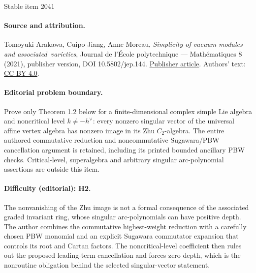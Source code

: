 \documentclass[11pt]{article}
\numberwithin{equation}{section}
\begin{document}
\begin{center}{\Large Stable item 2041}\end{center}
\paragraph{Source and attribution.}
Tomoyuki Arakawa, Cuipo Jiang, Anne Moreau, \emph{Simplicity of vacuum modules and associated varieties}, Journal de l’École polytechnique — Mathématiques 8 (2021), publisher version, DOI 10.5802/jep.144. \href{https://jep.centre-mersenne.org/articles/10.5802/jep.144/}{Publisher article}. Authors' text: \href{https://creativecommons.org/licenses/by/4.0/}{CC BY 4.0}.
\paragraph{Editorial problem boundary.}
Prove only Theorem 1.2 below for a finite-dimensional complex simple Lie algebra and noncritical level \(k\ne-h^\vee\): every nonzero singular vector of the universal affine vertex algebra has nonzero image in its Zhu \(C_2\)-algebra. The entire authored commutative reduction and noncommutative Sugawara/PBW cancellation argument is retained, including its printed bounded ancillary PBW checks. Critical-level, superalgebra and arbitrary singular arc-polynomial assertions are outside this item.
\paragraph{Difficulty (editorial): H2.}
The nonvanishing of the Zhu image is not a formal consequence of the associated graded invariant ring, whose singular arc-polynomials can have positive depth. The author combines the commutative highest-weight reduction with a carefully chosen PBW monomial and an explicit Sugawara commutator expansion that controls its root and Cartan factors. The noncritical-level coefficient then rules out the proposed leading-term cancellation and forces zero depth, which is the nonroutine obligation behind the selected singular-vector statement.
\end{document}
